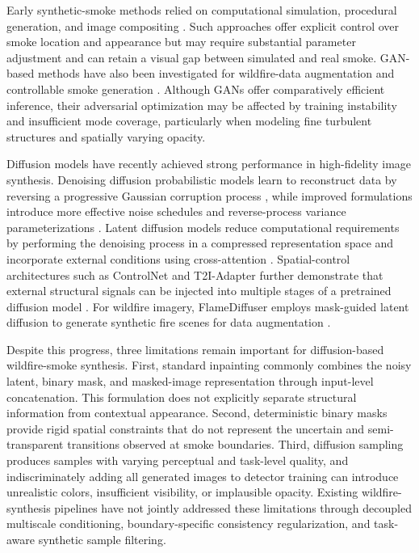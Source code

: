 \documentclass[journal]{IEEEtran}
\begin{document}
Early synthetic-smoke methods relied on computational simulation,
procedural generation, and image compositing
\cite{6053841,6425498}. Such approaches offer explicit
control over smoke location and appearance but may require substantial
parameter adjustment and can retain a visual gap between simulated and
real smoke. GAN-based methods have also been investigated for
wildfire-data augmentation and controllable smoke generation
\cite{rs12223715,9249044}. Although GANs offer comparatively efficient
inference, their adversarial optimization may be affected by training
instability and insufficient mode coverage, particularly when modeling
fine turbulent structures and spatially varying opacity.

Diffusion models have recently achieved strong performance in
high-fidelity image synthesis. Denoising diffusion probabilistic models
learn to reconstruct data by reversing a progressive Gaussian
corruption process
\cite{ho2020denoisingdiffusionprobabilisticmodels}, while improved
formulations introduce more effective noise schedules and
reverse-process variance parameterizations
\cite{nichol2021improveddenoisingdiffusionprobabilistic}. Latent
diffusion models reduce computational requirements by performing the
denoising process in a compressed representation space and incorporate
external conditions using cross-attention
\cite{rombach2022highresolutionimagesynthesislatent}. Spatial-control
architectures such as ControlNet and T2I-Adapter further demonstrate
that external structural signals can be injected into multiple stages
of a pretrained diffusion model
\cite{zhang2023addingconditionalcontroltexttoimage,
mou2023t2iadapterlearningadaptersdig}. For wildfire imagery,
FlameDiffuser employs mask-guided latent diffusion to generate synthetic
fire scenes for data augmentation
\cite{wang2024flamediffuserwildfireimage}.

Despite this progress, three limitations remain important for
diffusion-based wildfire-smoke synthesis. First, standard inpainting
commonly combines the noisy latent, binary mask, and masked-image
representation through input-level concatenation. This formulation does
not explicitly separate structural information from contextual
appearance. Second, deterministic binary masks provide rigid spatial
constraints that do not represent the uncertain and semi-transparent
transitions observed at smoke boundaries. Third, diffusion sampling
produces samples with varying perceptual and task-level quality, and
indiscriminately adding all generated images to detector training can
introduce unrealistic colors, insufficient visibility, or implausible
opacity. Existing wildfire-synthesis pipelines have not jointly
addressed these limitations through decoupled multiscale conditioning,
boundary-specific consistency regularization, and task-aware synthetic
sample filtering.
\end{document}
